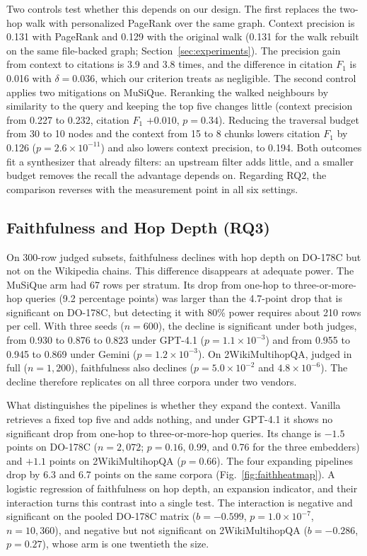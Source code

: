 Two controls test whether this depends on our design. The first
replaces the two-hop walk with personalized PageRank over the same
graph. Context
precision is 0.131 with PageRank and 0.129 with the original walk (0.131
for the walk rebuilt on the same file-backed graph;
Section~\ref{sec:experiments}). The precision gain from context to
citations is 3.9 and 3.8 times, and the difference in citation $F_1$ is
0.016 with $\delta = 0.036$, which our criterion treats as negligible.
The second control applies two mitigations on MuSiQue. Reranking the
walked neighbours by similarity to the query and keeping the top five
changes little (context precision from 0.227 to 0.232, citation $F_1$
$+0.010$, $p = 0.34$). Reducing the traversal budget from 30 to 10 nodes
and the context from 15 to 8 chunks lowers citation $F_1$ by 0.126
($p = 2.6 \times 10^{-11}$) and also lowers context precision, to 0.194.
Both outcomes fit a synthesizer that already filters: an upstream
filter adds little, and a smaller budget removes the recall the
advantage depends on. Regarding RQ2, the comparison
reverses with the measurement point in all six settings.

\subsection{Faithfulness and Hop Depth (RQ3)}
\label{sec:c3}
On 300-row judged subsets, faithfulness declines with hop depth on
DO-178C but not on the Wikipedia chains. This difference disappears at
adequate power. The MuSiQue arm had 67 rows per
stratum. Its drop from one-hop to three-or-more-hop queries (9.2
percentage points) was larger than the 4.7-point drop that is
significant on DO-178C, but detecting it with 80\% power requires about
210 rows per cell. With three seeds ($n = 600$), the decline is
significant under both judges, from 0.930 to 0.876 to 0.823 under GPT-4.1
($p = 1.1 \times 10^{-3}$) and from 0.955 to 0.945 to 0.869 under Gemini
($p = 1.2 \times 10^{-3}$). On 2WikiMultihopQA, judged in full
($n = 1{,}200$), faithfulness also declines ($p = 5.0 \times 10^{-2}$ and
$4.8 \times 10^{-6}$). The decline therefore replicates on all three
corpora under two vendors.

What distinguishes the pipelines is whether they expand the context.
Vanilla retrieves a fixed top five and adds nothing, and under GPT-4.1
it shows no significant drop from one-hop to three-or-more-hop queries.
Its change is $-1.5$ points on DO-178C ($n = 2{,}072$; $p = 0.16$, 0.99,
and 0.76 for the three embedders) and $+1.1$ points on 2WikiMultihopQA
($p = 0.66$). The four expanding pipelines drop by 6.3 and 6.7 points on
the same corpora (Fig.~\ref{fig:faithheatmap}). A logistic regression
of faithfulness on hop depth, an expansion indicator, and their
interaction turns this contrast into a single test. The interaction is
negative and significant on the pooled DO-178C matrix ($b = -0.599$,
$p = 1.0 \times 10^{-7}$, $n = 10{,}360$), and negative but not
significant on 2WikiMultihopQA ($b = -0.286$, $p = 0.27$), whose arm is
one twentieth the size.

